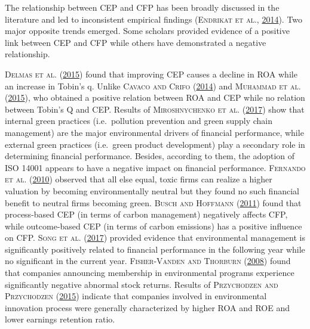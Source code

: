 \documentclass[12pt,]{article}
\begin{document}
The relationship between CEP and CFP has been broadly discussed in the
literature and led to inconsistent empirical findings (\textsc{Endrikat
et al.},
\protect\hyperlink{ref-EndrikatMakingsenseconflicting2014}{2014}). Two
major opposite trends emerged. Some scholars provided evidence of a
positive link between CEP and CFP while others have demonstrated a
negative relationship.

\textsc{Delmas et al.} (\protect\hyperlink{ref-Delmas2015}{2015}) found
that improving CEP causes a decline in ROA while an increase in Tobin's
q. Unlike \textsc{Cavaco and Crifo}
(\protect\hyperlink{ref-Cavaco2014}{2014}) and \textsc{Muhammad et al.}
(\protect\hyperlink{ref-Muhammadrelationshipenvironmentalperformance2015}{2015}),
who obtained a positive relation between ROA and CEP while no relation
between Tobin's Q and CEP. Results of \textsc{Miroshnychenko et al.}
(\protect\hyperlink{ref-MiroshnychenkoGreenpracticesfinancial2017}{2017})
show that internal green practices (i.e.~pollution prevention and green
supply chain management) are the major environmental drivers of
financial performance, while external green practices (i.e.~green
product development) play a secondary role in determining financial
performance. Besides, according to them, the adoption of ISO 14001
appears to have a negative impact on financial performance.
\textsc{Fernando et al.} (\protect\hyperlink{ref-Fernando2010}{2010})
observed that all else equal, toxic firms can realize a higher valuation
by becoming environmentally neutral but they found no such financial
benefit to neutral firms becoming green. \textsc{Busch and Hoffmann}
(\protect\hyperlink{ref-Busch2011a}{2011}) found that process-based CEP
(in terms of carbon management) negatively affects CFP, while
outcome-based CEP (in terms of carbon emissions) has a positive
influence on CFP. \textsc{Song et al.}
(\protect\hyperlink{ref-SongCanenvironmentalmanagement2017}{2017})
provided evidence that environmental management is significantly
positively related to financial performance in the following year while
no significant in the current year. \textsc{Fisher-Vanden and Thorburn}
(\protect\hyperlink{ref-Fisher-Vanden2008}{2008}) found that companies
announcing membership in environmental programs experience significantly
negative abnormal stock returns. Results of \textsc{Przychodzen and
Przychodzen}
(\protect\hyperlink{ref-PrzychodzenRelationshipsecoinnovationfinancial2015}{2015})
indicate that companies involved in environmental innovation process
were generally characterized by higher ROA and ROE and lower earnings
retention ratio.
\end{document}
